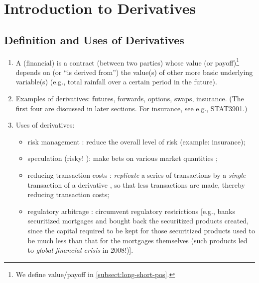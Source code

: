 \section{Introduction to Derivatives}
\subsection{Definition and Uses of Derivatives}
\begin{enumerate}
\item A (financial)  is a contract  (between
two parties) whose value (or payoff)\footnote{We define value/payoff in
\cref{subsect:long-short-pos}.} depends on (or ``is derived from'') the value(s)
of other more basic underlying variable(s) (e.g., total rainfall
 over a certain period in the future).

\item Examples of derivatives: futures, forwards, options, swaps, insurance.
(The first four are discussed in later sections. For insurance, see e.g.,
STAT3901.)

\item Uses of derivatives:
\begin{itemize}
\item risk management : reduce the overall level of risk
 (example: insurance);

\item speculation  (risky!
{\color{red}}): make bets  on
various market quantities ;

\item reducing transaction costs 
: \emph{replicate}  a
series of transactions
  
by a \emph{single} transaction  of a derivative
, so that less transactions are made, thereby reducing
transaction costs;

\item regulatory arbitrage : circumvent regulatory
restrictions  [e.g., banks  securitized mortgages
 and bought back the securitized products created, since the
capital required to be kept for those securitized products used to be much less
than that for the mortgages themselves \parencite[Section~8.3]{hull2022options}
(such products led to \emph{global financial crisis}  in 2008!)].
\end{itemize}
\end{enumerate}


